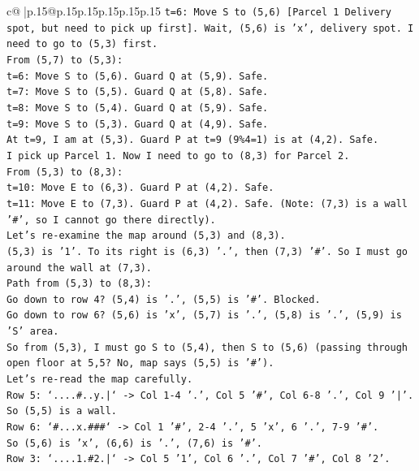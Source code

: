 \documentclass{article}
\begin{document}
{\begin{supertabular}{c@{$\;$}|p{.15\linewidth}@{}p{.15\linewidth}p{.15\linewidth}p{.15\linewidth}p{.15\linewidth}p{.15\linewidth}}
{{{\texttt{t=6: Move S to (5,6) {[}Parcel 1 Delivery spot, but need to pick up first{]}. Wait, (5,6) is 'x', delivery spot. I need to go to (5,3) first.} \\
\texttt{From (5,7) to (5,3):} \\
\texttt{t=6: Move S to (5,6). Guard Q at (5,9). Safe.} \\
\texttt{t=7: Move S to (5,5). Guard Q at (5,8). Safe.} \\
\texttt{t=8: Move S to (5,4). Guard Q at (5,9). Safe.} \\
\texttt{t=9: Move S to (5,3). Guard Q at (4,9). Safe.} \\
\texttt{At t=9, I am at (5,3). Guard P at t=9 (9\%4=1) is at (4,2). Safe.} \\
\texttt{I pick up Parcel 1. Now I need to go to (8,3) for Parcel 2.} \\
\texttt{From (5,3) to (8,3):} \\
\texttt{t=10: Move E to (6,3). Guard P at (4,2). Safe.} \\
\texttt{t=11: Move E to (7,3). Guard P at (4,2). Safe. (Note: (7,3) is a wall '\#', so I cannot go there directly).} \\
\texttt{Let's re{-}examine the map around (5,3) and (8,3).} \\
\texttt{(5,3) is '1'. To its right is (6,3) '.', then (7,3) '\#'. So I must go around the wall at (7,3).} \\
\texttt{Path from (5,3) to (8,3):} \\
\texttt{Go down to row 4? (5,4) is '.', (5,5) is '\#'. Blocked.} \\
\texttt{Go down to row 6? (5,6) is 'x', (5,7) is '.', (5,8) is '.', (5,9) is 'S' area.} \\
\texttt{So from (5,3), I must go S to (5,4), then S to (5,6) (passing through open floor at 5,5? No, map says (5,5) is '\#').} \\
\texttt{Let's re{-}read the map carefully.} \\
\texttt{Row 5: `....\#..y.|` {-}> Col 1{-}4 '.', Col 5 '\#', Col 6{-}8 '.', Col 9 '|'.} \\
\texttt{So (5,5) is a wall.} \\
\texttt{Row 6: `\#...x.\#\#\#` {-}> Col 1 '\#', 2{-}4 '.', 5 'x', 6 '.', 7{-}9 '\#'.} \\
\texttt{So (5,6) is 'x', (6,6) is '.', (7,6) is '\#'.} \\
\texttt{Row 3: `....1.\#2.|` {-}> Col 5 '1', Col 6 '.', Col 7 '\#', Col 8 '2'.} \\
}}}
\end{supertabular}}
\end{document}
